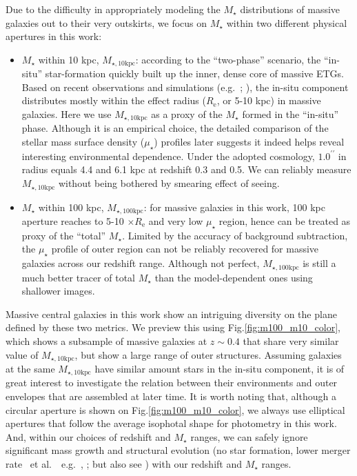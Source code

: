 \documentclass{emulateapj}
\def\arcsec{{\prime\prime}}
\def\etal{{\ et al.~}}
\def\mstar{{$M_{\star}$}}
\def\minn{{$M_{\star,10\mathrm{kpc}}$}}
\def\mtot{{$M_{\star,100\mathrm{kpc}}$}}
\def\mden{{$\mu_{\star}$}}
\newcommand{\update}[1]{\textcolor{Bittersweet}{#1}}
\begin{document}
\begin{CJK*}{UTF8}{gbsn}
    \update{Due to the difficulty in appropriately modeling the \mstar{} distributions of 
    massive galaxies out to their very outskirts, we focus on \mstar{} within two different 
    physical apertures in this work:}
    
    \begin{itemize}
        \item \update{\mstar{} within 10 kpc, \minn{}: according to the ``two-phase'' 
            scenario, the ``in-situ'' star-formation quickly built up the inner, dense 
            core of massive ETGs.  
            Based on recent observations and simulations (e.g.~\citealt{vanDokkum2010}; 
            \citealt{RodriguezGomez2016}), the in-situ 
            component distributes mostly within the effect radius ($R_{\mathrm{e}}$, 
            or 5-10 kpc) in massive galaxies.  
            Here we use \minn{} as a proxy of the \mstar{} formed in the ``in-situ''
            phase.  Although it is an empirical choice, the detailed comparison of 
            the stellar mass surface density (\mden{}) profiles later suggests it indeed 
            helps reveal interesting environmental dependence.  
            Under the adopted cosmology, $1.0^{\arcsec}$ in radius equals 4.4 and 6.1 kpc 
            at redshift 0.3 and 0.5.  
            We can reliably measure \minn{} without being bothered by smearing effect
            of seeing.}
        \item \update{\mstar{} within 100 kpc, \mtot{}: for massive galaxies in this work, 
            100 kpc aperture reaches to 5-10 $\times R_{\mathrm{e}}$ and very low 
            \mden{} region, hence can be treated as proxy of the ``total'' \mstar{}. 
            Limited by the accuracy of background subtraction, the \mden{} profile 
            of outer region can not be reliably recovered for massive galaxies across 
            our redshift range. 
            Although not perfect, \mtot{} is still a much better tracer of total 
            \mstar{} than the model-dependent ones using shallower images.}
    \end{itemize}
    
    \update{Massive central galaxies in this work show an intriguing diversity on the 
    plane defined by these two metrics.  
    We preview this using Fig.\ref{fig:m100_m10_color}, which shows a subsample of 
    massive galaxies at $z\sim 0.4$ that share very similar value of \minn{}, but show 
    a large range of outer structures. 
    Assuming galaxies at the same \minn{} have similar amount stars in the in-situ 
    component, it is of great interest to investigate the relation between their 
    environments and outer envelopes that are assembled at later time. 
    It is worth noting that, although a circular aperture is shown on 
    Fig.\ref{fig:m100_m10_color}, we always use elliptical apertures that follow the 
    average isophotal shape for photometry in this work.}
    And, within our choices of redshift and \mstar{} ranges, we can safely ignore 
    significant mass growth and structural evolution 
    (no star formation, lower merger rate \etal~e.g.\ \citealt{Bellstedt2016},
    \citealt{Inagaki2015}; but also see \citealt{Bai2014}) 
    with our redshift and \mstar{} ranges. 


\end{CJK*}
\end{document}
